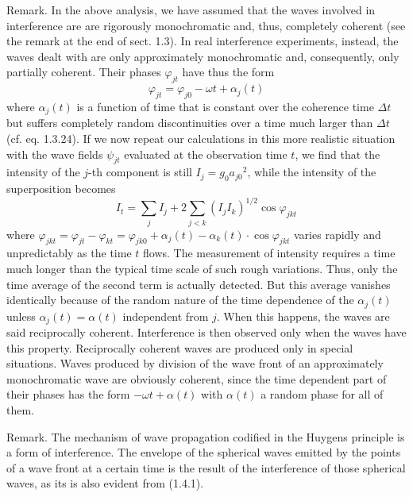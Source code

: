 \documentclass{article}
\begin{document}
Remark. In the above analysis, we have assumed that the waves involved in interference are are rigorously monochromatic and, thus, completely coherent (see the
remark at the end of sect. 1.3). In real interference experiments, instead, the waves dealt with are only approximately monochromatic and, consequently, only partially coherent. Their phases $\varphi_{j t}$ have thus the form
$$
\begin{equation*}
\varphi_{j t}=\varphi_{j 0}-\omega t+\alpha_{j}(t) \tag{1.5.8}
\end{equation*}
$$
where $\alpha_{j}(t)$ is a function of time that is constant over the coherence time $\Delta t$ but suffers completely random discontinuities over a time much larger than $\Delta t$ (cf. eq. 1.3.24). If we now repeat our calculations in this more realistic situation with the wave fields $\psi_{j t}$ evaluated at the observation time $t$, we find that the intensity of the $j$-th component is still $I_{j}=g_{0} a_{j 0}{ }^{2}$, while the intensity of the superposition becomes
$$
\begin{equation*}
I_{t}=\sum_{j} I_{j}+2 \sum_{j<k}\left(I_{j} I_{k}\right)^{1 / 2} \cos \varphi_{j k t} \tag{1.5.9}
\end{equation*}
$$
where $\varphi_{j k t}=\varphi_{j t}-\varphi_{k t}=\varphi_{j k 0}+\alpha_{j}(t)-\alpha_{k}(t) \cdot \cos \varphi_{j k t}$ varies rapidly and unpredictably as the time $t$ flows. The measurement of intensity requires a time much longer than the typical time scale of such rough variations. Thus, only the time average of the second term is actually detected. But this average vanishes identically because of the random nature of the time dependence of the $\alpha_{j}(t)$ unless $\alpha_{j}(t)=\alpha(t)$ independent from $j$. When this happens, the waves are said reciprocally coherent. Interference is then observed only when the waves have this property. Reciprocally coherent waves are produced only in special situations. Waves produced by division of the wave front of an approximately monochromatic wave are obviously coherent, since the time dependent part of their phases has the form $-\omega t+\alpha(t)$ with $\alpha(t)$ a random phase for all of them.

Remark. The mechanism of wave propagation codified in the Huygens principle is a form of interference. The envelope of the spherical waves emitted by the points of a wave front at a certain time is the result of the interference of those spherical waves, as its is also evident from (1.4.1).
\end{document}
